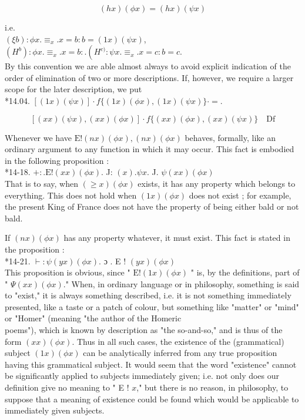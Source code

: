 \documentclass[10pt]{article}
\begin{document}
$$
(h x)(\phi x)=(h x)(\psi x)
$$

i.e.\\
$(\xi b): \phi x . \equiv_{x} . x=b: b=(1 x)(\psi x)$,\\
$\left(H^{b}\right): \phi x . \equiv_{x} . x=b: .\left(H^{c)}: \psi x . \equiv_{x} . x=c: b=c\right.$.\\
By this convention we are able almost always to avoid explicit indication of the order of elimination of two or more descriptions. If, however, we require a larger scope for the later description, we put\\
*14.04. $[(1 x)(\psi x)] \cdot f\{(1 x)(\phi x),(1 x)(\psi x)\} \cdot=$.

$$
[(x x)(\psi x),(x x)(\phi x)] \cdot f\{(x x)(\phi x),(x x)(\psi x)\} \quad \mathrm{Df}
$$

Whenever we have $\mathrm{E}!(n x)(\phi x),(n x)(\phi x)$ behaves, formally, like an ordinary argument to any function in which it may occur. This fact is embodied in the following proposition :\\
*14-18. $+: . \mathrm{E}!(x x)(\phi x)$. J: $(x) . \psi x$. J. $\psi(x x)(\phi x)$\\
That is to say, when $(\geqslant x)(\phi x)$ exists, it has any property which belongs to everything. This does not hold when $(1 x)(\phi x)$ does not exist ; for example, the present King of France does not have the property of being either bald or not bald.

If $(n x)(\phi x)$ has any property whatever, it must exist. This fact is stated in the proposition :\\
*14-21. $\vdash: \psi(y x)(\phi x)$. ɔ . E ! $(y x)(\phi x)$\\
This proposition is obvious, since " $\mathrm{E}!(1 x)(\phi x)$ " is, by the definitions, part of " $\Psi(x x)(\phi x)$." When, in ordinary language or in philosophy, something is said to "exist," it is always something described, i.e. it is not something immediately presented, like a taste or a patch of colour, but something like "matter" or "mind" or "Homer" (meaning "the author of the Homeric\\
poems"), which is known by description as "the so-and-so," and is thus of the form $(x x)(\phi x)$. Thus in all such cases, the existence of the (grammatical) subject $(1 x)(\phi x)$ can be analytically inferred from any true proposition having this grammatical subject. It would seem that the word "existence" cannot be significantly applied to subjects immediately given; i.e. not only does our definition give no meaning to " E ! $x$," but there is no reason, in philosophy, to suppose that a meaning of existence could be found which would be applicable to immediately given subjects.
\end{document}
